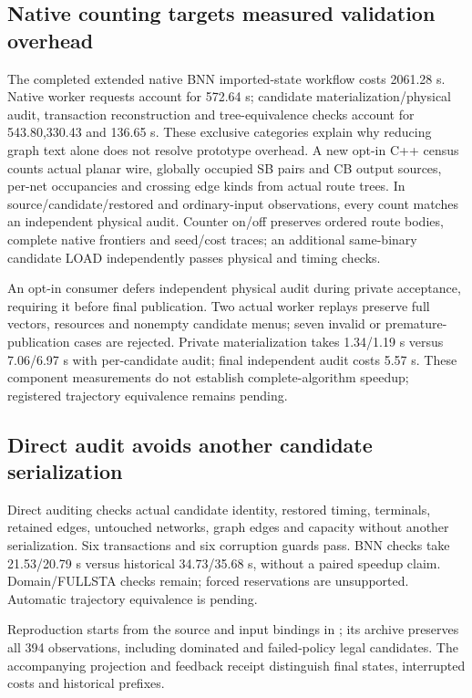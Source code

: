 \documentclass[conference,10pt]{IEEEtran}
\begin{document}
\subsection{Native counting targets measured validation overhead}
The completed extended native BNN imported-state workflow costs 2061.28 s. Native worker requests account for 572.64 s; candidate materialization/physical audit, transaction reconstruction and tree-equivalence checks account for 543.80,330.43 and 136.65 s. These exclusive categories explain why reducing graph text alone does not resolve prototype overhead. A new opt-in C++ census counts actual planar wire, globally occupied SB pairs and CB output sources, per-net occupancies and crossing edge kinds from actual route trees. In source/candidate/restored and ordinary-input observations, every count matches an independent physical audit. Counter on/off preserves ordered route bodies, complete native frontiers and seed/cost traces; an additional same-binary candidate LOAD independently passes physical and timing checks.

An opt-in consumer defers independent physical audit during private acceptance, requiring it before final publication. Two actual worker replays preserve full vectors, resources and nonempty candidate menus; seven invalid or premature-publication cases are rejected. Private materialization takes 1.34/1.19 s versus 7.06/6.97 s with per-candidate audit; final independent audit costs 5.57 s. These component measurements do not establish complete-algorithm speedup; registered trajectory equivalence remains pending.

\subsection{Direct audit avoids another candidate serialization}
Direct auditing checks actual candidate identity, restored timing, terminals, retained edges, untouched networks, graph edges and capacity without another serialization. Six transactions and six corruption guards pass. BNN checks take 21.53/20.79 s versus historical 34.73/35.68 s, without a paired speedup claim. Domain/FULLSTA checks remain; forced reservations are unsupported. Automatic trajectory equivalence is pending.

Reproduction starts from the source and input bindings in ; its archive preserves all 394 observations, including dominated and failed-policy legal candidates. The accompanying projection and feedback receipt distinguish final states, interrupted costs and historical prefixes.
\end{document}
